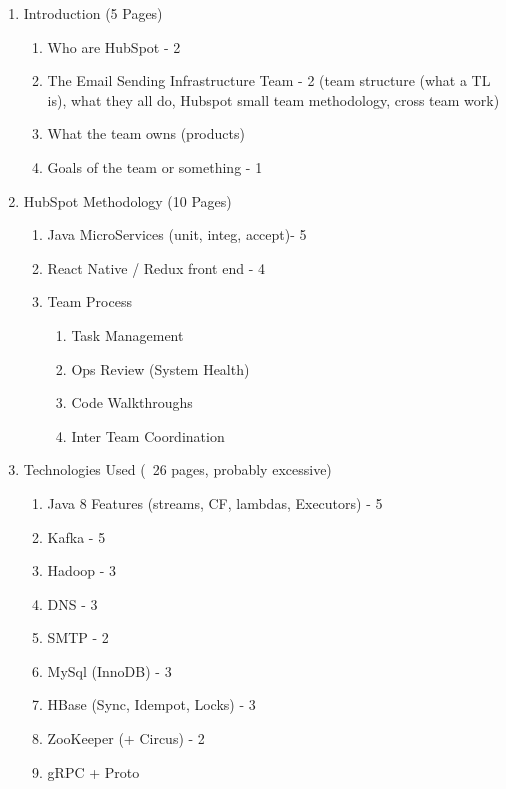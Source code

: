 \begin{enumerate}
	\item Introduction (5 Pages)
	\begin{enumerate}
    	\item Who are HubSpot - 2
        \item The Email Sending Infrastructure Team - 2 (team structure (what a TL is), what they all do, Hubspot small team methodology, cross team work)
        \item What the team owns (products)
        \item Goals of the team or something - 1
    \end{enumerate}
    
    \item HubSpot Methodology (10 Pages)
    \begin{enumerate}
    	\item Java MicroServices (unit, integ, accept)- 5
        \item React Native / Redux front end - 4
        \item Team Process
        \begin{enumerate}
            \item Task Management
            \item Ops Review (System Health)
            \item Code Walkthroughs
            \item Inter Team Coordination
        \end{enumerate}	
    \end{enumerate}
    
	
    \item Technologies Used (~26 pages, probably excessive)
    \begin{enumerate}
    	\item Java 8 Features (streams, CF, lambdas, Executors) - 5
        \item Kafka - 5
        \item Hadoop - 3
        \item DNS - 3
        \item SMTP - 2
        \item MySql (InnoDB) - 3
        \item HBase (Sync, Idempot, Locks) - 3
        \item ZooKeeper (+ Circus) - 2
        \item gRPC + Proto
    \end{enumerate}    
    

\end{enumerate}
